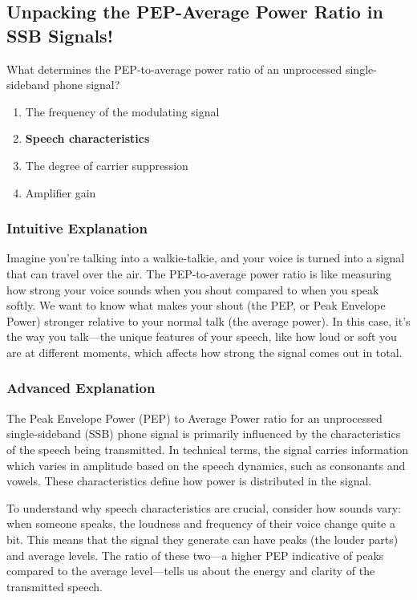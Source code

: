 \subsection{Unpacking the PEP-Average Power Ratio in SSB Signals!}

\begin{tcolorbox}[colback=blue!5!white, colframe=blue!75!black, title=Question ID: \textbf{E8A07}]
What determines the PEP-to-average power ratio of an unprocessed single-sideband phone signal?
\begin{enumerate}[label=\Alph*.]
    \item The frequency of the modulating signal
    \item \textbf{Speech characteristics}
    \item The degree of carrier suppression
    \item Amplifier gain
\end{enumerate}
\end{tcolorbox}

\subsubsection{Intuitive Explanation}
Imagine you're talking into a walkie-talkie, and your voice is turned into a signal that can travel over the air. The PEP-to-average power ratio is like measuring how strong your voice sounds when you shout compared to when you speak softly. We want to know what makes your shout (the PEP, or Peak Envelope Power) stronger relative to your normal talk (the average power). In this case, it's the way you talk—the unique features of your speech, like how loud or soft you are at different moments, which affects how strong the signal comes out in total.

\subsubsection{Advanced Explanation}
The Peak Envelope Power (PEP) to Average Power ratio for an unprocessed single-sideband (SSB) phone signal is primarily influenced by the characteristics of the speech being transmitted. In technical terms, the signal carries information which varies in amplitude based on the speech dynamics, such as consonants and vowels. These characteristics define how power is distributed in the signal.

To understand why speech characteristics are crucial, consider how sounds vary: when someone speaks, the loudness and frequency of their voice change quite a bit. This means that the signal they generate can have peaks (the louder parts) and average levels. The ratio of these two—a higher PEP indicative of peaks compared to the average level—tells us about the energy and clarity of the transmitted speech.

